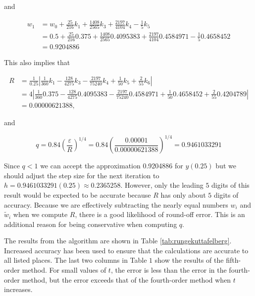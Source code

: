 \begin{mysolution}
and

$$
\begin{aligned}
w_{1} & =w_{0}+\frac{25}{216} k_{1}+\frac{1408}{2565} k_{3}+\frac{2197}{4104} k_{4}-\frac{1}{5} k_{5} \\
& =0.5+\frac{25}{216} 0.375+\frac{1408}{2565} 0.4095383+\frac{2197}{4104} 0.4584971-\frac{1}{5} 0.4658452 \\
& =0.9204886
\end{aligned}
$$

This also implies that

$$
\begin{aligned}
R & =\frac{1}{0.25}\left|\frac{1}{360} k_{1}-\frac{128}{4275} k_{3}-\frac{2197}{75240} k_{4}+\frac{1}{50} k_{5}+\frac{2}{55} k_{6}\right| \\
& =4\left|\frac{1}{360} 0.375-\frac{128}{4275} 0.4095383-\frac{2197}{75240} 0.4584971+\frac{1}{50} 0.4658452+\frac{2}{55} 0.4204789\right| \\
& =0.00000621388,
\end{aligned}
$$

and

$$
q=0.84\left(\frac{\varepsilon}{R}\right)^{1 / 4}=0.84\left(\frac{0.00001}{0.00000621388}\right)^{1 / 4}=0.9461033291
$$

Since $q<1$ we can accept the approximation 0.9204886 for $y(0.25)$ but we should adjust the step size for the next iteration to $h=0.9461033291(0.25) \approx 0.2365258$. However, only the leading $5$ digits of this result would be expected to be accurate because $R$ has only about $5$ digits of accuracy. Because we are effectively subtracting the nearly equal numbers $w_{i}$ and $\tilde{w}_{i}$ when we compute $R$, there is a good likelihood of round-off error. This is an additional reason for being conservative when computing $q$.

The results from the algorithm are shown in Table \ref{tab:rungekuttafelberg}. Increased accuracy has been used to ensure that the calculations are accurate to all listed places. The last two columns in Table $1$ show the results of the fifth-order method. For small values of $t$, the error is less than the error in the fourth-order method, but the error exceeds that of the fourth-order method when $t$ increases.
\end{mysolution}


